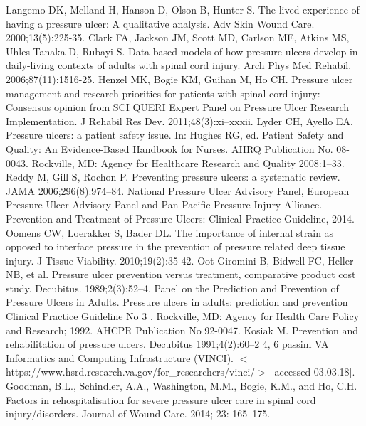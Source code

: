 \documentclass{amia}
\begin{document}
\makeatletter
\renewcommand{\@biblabel}[1]{\hfill #1.}
\makeatother



{\footnotesize

\begin{thebibliography}{1}
\setlength\itemsep{-0.1em}

Langemo DK, Melland H, Hanson D, Olson B, Hunter S. The lived experience of having a pressure ulcer: A qualitative analysis. Adv Skin Wound Care. 2000;13(5):225-35.
Clark FA, Jackson JM, Scott MD, Carlson ME, Atkins MS, Uhles-Tanaka D, Rubayi S. Data-based models of how pressure ulcers develop in daily-living contexts of adults with spinal cord injury. Arch Phys Med Rehabil. 2006;87(11):1516-25.
Henzel MK, Bogie KM, Guihan M, Ho CH. Pressure ulcer management and research priorities for patients with spinal cord injury: Consensus opinion from SCI QUERI Expert Panel on Pressure Ulcer Research Implementation. J Rehabil Res Dev. 2011;48(3):xi–xxxii.
Lyder CH, Ayello EA. Pressure ulcers: a patient safety issue. In: Hughes RG, ed. Patient Safety and Quality: An Evidence-Based Handbook for Nurses. AHRQ Publication No. 08-0043. Rockville, MD: Agency for Healthcare Research and Quality 2008:1–33.
Reddy M, Gill S, Rochon P. Preventing pressure ulcers: a systematic review. JAMA 2006;296(8):974–84.
National Pressure Ulcer Advisory Panel, European Pressure Ulcer Advisory Panel and Pan Pacific Pressure Injury Alliance. Prevention and Treatment of Pressure Ulcers: Clinical Practice Guideline, 2014.
Oomens CW, Loerakker S, Bader DL. The importance of internal strain as opposed to interface pressure in the prevention of pressure related deep tissue injury. J Tissue Viability. 2010;19(2):35-42.
Oot-Giromini B, Bidwell FC, Heller NB, et al. Pressure ulcer prevention versus treatment, comparative product cost study. Decubitus. 1989;2(3):52–4.
Panel on the Prediction and Prevention of Pressure Ulcers in Adults. Pressure ulcers in adults: prediction and prevention Clinical Practice Guideline No 3 . Rockville, MD: Agency for Health Care Policy and Research; 1992. AHCPR Publication No 92-0047.
Kosiak M. Prevention and rehabilitation of pressure ulcers. Decubitus 1991;4(2):60–2 4, 6 passim
VA Informatics and Computing Infrastructure (VINCI). $<$https://www.hsrd.research.va.gov/for\_researchers/vinci/$>$ [accessed 03.03.18].
Goodman, B.L., Schindler, A.A., Washington, M.M., Bogie, K.M., and Ho, C.H. Factors in rehospitalisation for severe pressure ulcer care in spinal cord injury/disorders. Journal of Wound Care. 2014; 23: 165–175.

\end{thebibliography}}
\end{document}

